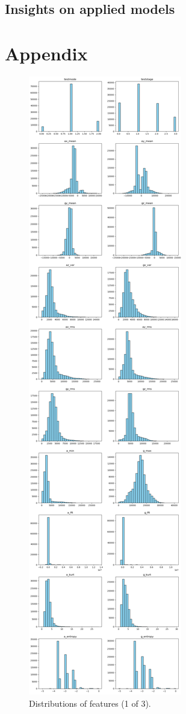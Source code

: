 \documentclass[10pt,twocolumn]{article}
\begin{document}
\subsection{Insights on applied models}


\clearpage  %
\appendix
\section*{Appendix}

\begin{figure}[H]
    \centering
    \includegraphics[width=0.85\linewidth, height=0.9\textheight]{distribution_1.png}
    \caption{Distributions of features (1 of 3).}
    \label{fig:distribution-1}
\end{figure}
\end{document}

